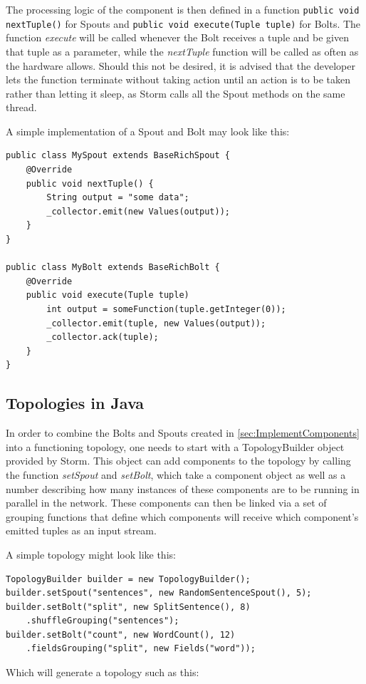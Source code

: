 \documentclass[12pt,a4paper]{article}
\begin{document}
The processing logic of the component is then defined in a function \lstinline$public void nextTuple()$ for Spouts and \lstinline$public void execute(Tuple tuple)$ for Bolts. The function \textit{execute} will be called whenever the Bolt receives a tuple and be given that tuple as a parameter, while the \textit{nextTuple} function will be called as often as the hardware allows. Should this not be desired, it is advised that the developer lets the function terminate without taking action until an action is to be taken rather than letting it sleep, as Storm calls all the Spout methods on the same thread.

A simple implementation of a Spout and Bolt may look like this:\\
\begin{lstlisting}
public class MySpout extends BaseRichSpout {
    @Override
    public void nextTuple() {
        String output = "some data";
        _collector.emit(new Values(output));
    }
}

public class MyBolt extends BaseRichBolt {
    @Override
    public void execute(Tuple tuple)
        int output = someFunction(tuple.getInteger(0));
        _collector.emit(tuple, new Values(output));
        _collector.ack(tuple);
    }
}
\end{lstlisting}
\subsection{Topologies in Java}
\label{sec:ImplementTopology}
In order to combine the Bolts and Spouts created in \ref{sec:ImplementComponents} into a functioning topology, one needs to start with a TopologyBuilder object provided by Storm. This object can add components to the topology by calling the function \textit{setSpout} and \textit{setBolt}, which take a component object as well as a number describing how many instances of these components are to be running in parallel in the network. These components can then be linked via a set of grouping functions that define which components will receive which component's emitted tuples as an input stream.\newpage

A simple topology might look like this:
\begin{lstlisting}
TopologyBuilder builder = new TopologyBuilder();
builder.setSpout("sentences", new RandomSentenceSpout(), 5);
builder.setBolt("split", new SplitSentence(), 8)
    .shuffleGrouping("sentences");
builder.setBolt("count", new WordCount(), 12)
    .fieldsGrouping("split", new Fields("word"));
\end{lstlisting}
Which will generate a topology such as this:\\
\end{document}
